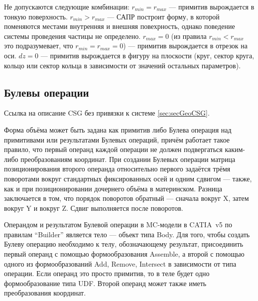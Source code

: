 Не допускаются следующие комбинации:
$r_{min} = r_{max}$ --- примитив вырождается в тонкую поверхность.
$r_{min} > r_{max}$ --- САПР построит форму, в которой поменяются местами внутренняя и внешняя повехрность, однако поведение системы проведения частицы не определено.
$r_{max} = 0$ (из правила $r_{min} < r_{max}$ это подразумевает, что $r_{min} = r_{max} = 0$) --- примитив вырождается в отрезок на оси.
$dz = 0$ --- примитив вырождается в фигуру на плоскости (круг, сектор круга, кольцо или сектор кольца в зависимости от значений остальных параметров).

\bigskip

%                                       

\subsection{Булевы операции}\label{sec:Boolean}

Ссылка на описание CSG без привязки к системе \ref{sec:secGeoCSG}.

Форма объёма может быть задана как примитив либо Булева операция над примитивами или результатами Булевых операций, причём работает такое правило, что первый операнд каждой операции не должен подвергаться каким-либо преобразованиям координат. При создании Булевых операции матрица позиционирования второго операнда относительно первого задаётся трёмя поворотами вокруг стандартных фиксированных осей и одним сдвигом --- также, как и при позиционировании дочернего объёма в материнском. Разница заключается в том, что порядок поворотов обратный --- сначала вокруг X, затем вокруг Y и вокруг Z. Сдвиг выполняется после поворотов.

Операндом и результатом Булевой операции в MC-модели в CATIA~v5 по правилам ``Builder'' является тело --- объект типа Body. Для того, чтобы создать Булеву операцию необходимо к телу, обозначающему результат, присоединить первый операнд с помощью формообразования Assemble, а второй с помощью одного из формообразований Add, Remove, Intersect в зависимости от типа операции. Если операнд это просто примитив, то в теле будет одно формообразование типа UDF. Второй операнд может также иметь преобразования координат.

